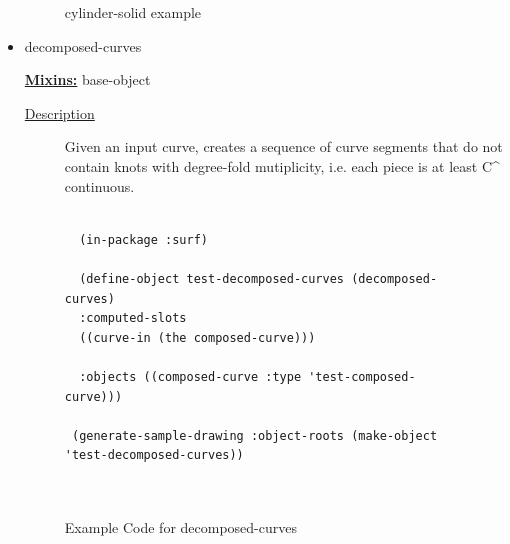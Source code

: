 \documentclass [11pt]{book}
\begin{document}
\begin{itemize}
\begin{figure}
\caption{cylinder-solid example}

\label{fig:cylinder-solid}

\end{figure}






\item {}decomposed-curves


\textbf{
\underline{Mixins:}} base-object





\begin{description}

\item [
\underline{Description}]


Given an input curve, creates a sequence of curve segments that do not contain 
knots with degree-fold mutiplicity, i.e. each piece is at least C^ continuous.



\end{description}




\begin{figure}
\begin{lrbox}{\boxedverb}
\begin{minipage}{\linewidth}
{\small

\begin{verbatim}
  
  (in-package :surf)  

  (define-object test-decomposed-curves (decomposed-curves)
  :computed-slots
  ((curve-in (the composed-curve)))
  
  :objects ((composed-curve :type 'test-composed-curve)))

 (generate-sample-drawing :object-roots (make-object 'test-decomposed-curves))

 
\end{verbatim}}
\end{minipage}
\end{lrbox}
\fbox{\usebox{\boxedverb}}

\caption{Example Code for decomposed-curves}

\label{fig:example-code-decomposed-curves}

\end{figure}


\end{itemize}
\end{document}
